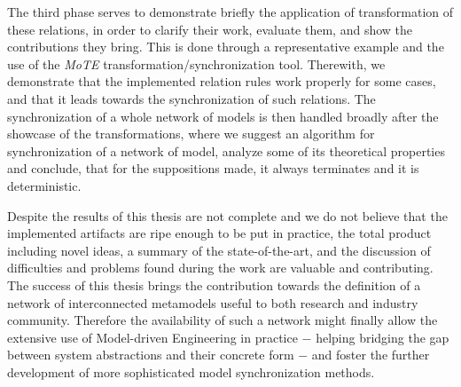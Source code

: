 \documentclass[tuberlin,cic,tc,english,noabntcite, oneside]{iiufrgs}
\begin{document}
The third phase serves to demonstrate briefly the application of transformation of these relations, in order to clarify their work, evaluate them, and show the contributions they bring. This is done through a representative example and the use of the \emph{MoTE} transformation/synchronization tool. Therewith, we demonstrate that the implemented relation rules work properly for some cases, and that it leads towards the synchronization of such relations. The synchronization of a whole network of models is then handled broadly after the showcase of the transformations, where we suggest an algorithm for synchronization of a network of model, analyze some of its theoretical properties and conclude, that for the suppositions made, it always terminates and it is deterministic.

Despite the results of this thesis are not complete and we do not believe that the implemented artifacts are ripe enough to be put in practice, the total product including novel ideas, a summary of the state-of-the-art, and the discussion of difficulties and problems found during the work are valuable and contributing. The success of this thesis brings the contribution towards the definition of a network of interconnected metamodels useful to both research and industry community. Therefore the availability of such a network might finally allow the extensive use of Model-driven Engineering in practice $-$ helping bridging the gap between system abstractions and their concrete form $-$ and foster the further development of more sophisticated model synchronization methods.




\end{document}
